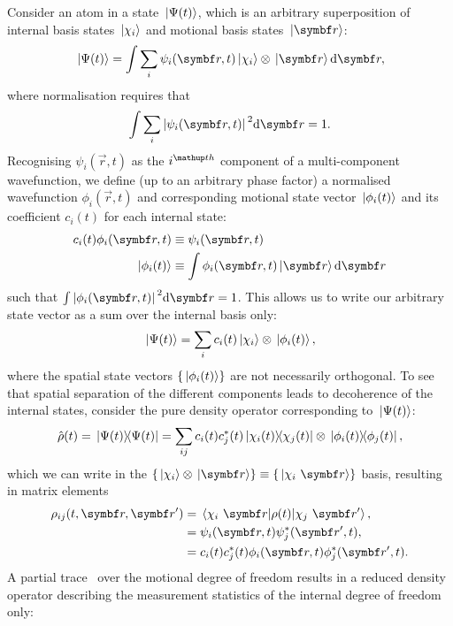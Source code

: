 Consider an atom in a state $\ket{\Psi(t)}$, which is an arbitrary superposition of internal basis states $\ket{\chi_i}$ and motional basis states $\ket{\vec r}$: 
\begin{align}
\ket{\Psi(t)} = \int \sum_i \psi_i(\vec r, t) \ket{\chi_i}\otimes\ket{\vec r} \dd\vec r,
\end{align}
where normalisation requires that
\begin{align}
\int \sum_i \abs{\psi_i(\vec r, t)}^2 \dd\vec r = 1.
\end{align}
Recognising $\psi_i(\vec r, t)$ as the $i^\up{th}$ component of a multi-component wavefunction, we define (up to an arbitrary phase factor) a normalised wavefunction $\phi_i(\vec r, t)$ and corresponding motional state vector $\ket{\phi_i(t)}$ and its coefficient $c_i(t)$ for each internal state:
\begin{align}\label{eq:product_state_vector}
c_i(t)\phi_i(\vec r, t) &\equiv \psi_i(\vec r, t) \\
\ket{\phi_i(t)} &\equiv \int \phi_i(\vec r, t)\ket{\vec r}\dd \vec r
\end{align}
such that $\int\abs{\phi_i(\vec r, t)}^2\dd \vec r = 1$. This allows us to write our arbitrary state vector as a sum over the internal basis only:
\begin{align}
\ket{\Psi(t)} = \sum_i c_i(t) \ket{\chi_i}\otimes\ket{\phi_i(t)},
\end{align}
where the spatial state vectors $\{\ket{\phi_i(t)}\}$ are not necessarily orthogonal. To see that spatial separation of the different components leads to decoherence of the internal states, consider the pure density operator corresponding to $\ket{\Psi(t)}$:
\begin{align}
\hat\rho(t) = \ketbra{\Psi(t)}{\Psi(t)} = \sum_{ij}
c_i(t) c_j^*(t)\ketbra{\chi_i(t)}{\chi_j(t)}\otimes\ketbra{\phi_i(t)}{\phi_j(t)},
\end{align}
which we can write in the $\{\ket{\chi_i}\otimes\ket{\vec r}\} \equiv \{\ket{\chi_i\ \vec r}\} $ basis, resulting in matrix elements
\begin{align}
\rho_{ij}(t, \vec r, \vec r^\prime) &= \matrixel{\chi_i\ \vec r}{\rho(t)}{\chi_j\ \vec r^\prime},\\
&= \psi_i(\vec r, t)\psi_j^*(\vec r^\prime, t),\\
&= c_i(t) c^*_j(t) \phi_i(\vec r, t) \phi_j^*(\vec r^\prime, t).
\end{align}
A partial trace~\cite{schlosshauer_decoherence:_2007} over the motional degree of freedom results in a reduced density operator describing the measurement statistics of the internal degree of freedom only:
